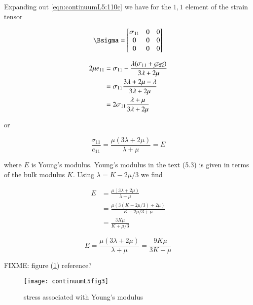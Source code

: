 Expanding out \ref{eqn:continuumL5:110c} we have for the $1,1$ element of the strain tensor


\begin{equation}\label{eqn:continuumL5:290}
\Bsigma =
\begin{bmatrix}
\sigma_{11} & 0 & 0\\
0 & 0 & 0 \\
0 & 0 & 0
\end{bmatrix}
\end{equation}

\begin{align*}
2 \mu e_{11}
&= \sigma_{11} - \frac{\lambda ( \sigma_{11} + \cancel{\sigma_{22}} ) }{3 \lambda + 2 \mu} \\
&= \sigma_{11} \frac{3 \lambda + 2 \mu - \lambda }{3 \lambda + 2 \mu} \\
&= 2 \sigma_{11} \frac{\lambda + \mu }{3 \lambda + 2 \mu}
\end{align*}

or

\begin{equation}\label{eqn:continuumL5:310}
\frac{\sigma_{11}}{e_{11}} = \frac{\mu(3 \lambda + 2 \mu)}{\lambda + \mu } = E
\end{equation}

where $E$ is Young's modulus.  Young's modulus in the text (5.3) is given in terms of the bulk modulus $K$.  Using $\lambda = K - 2\mu/3$ we find

\begin{align*}
E 
&=
\frac{\mu(3 \lambda + 2 \mu)}{\lambda + \mu } \\
&=
\frac{\mu(3 (K - 2\mu/3)+ 2 \mu)}{K - 2\mu/3 + \mu } \\
&=
\frac{3 K \mu}{ K + \mu/3 } 
\end{align*}

\begin{equation}\label{eqn:continuumL5:330}
\boxed{
E =
\frac{\mu(3 \lambda + 2 \mu)}{\lambda + \mu } =
\frac{9 K \mu}{ 3 K + \mu } 
}
\end{equation}

FIXME: figure (\ref{fig:continuumL5:continuumL5fig3}) reference?

\begin{figure}[htp]
   \centering
   \texttt{[image: continuumL5fig3]}
   \caption{stress associated with Young's modulus}\label{fig:continuumL5:continuumL5fig3}
\end{figure}


